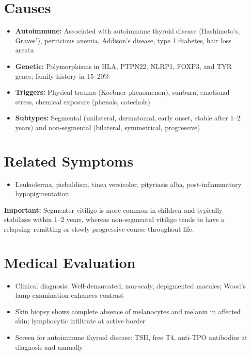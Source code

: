 \section*{Causes}
\begin{itemize}
  \item \textbf{Autoimmune:} Associated with autoimmune thyroid disease (Hashimoto's, Graves'), pernicious anemia, Addison's disease, type 1 diabetes, hair loss areata
  \item \textbf{Genetic:} Polymorphisms in HLA, PTPN22, NLRP1, FOXP3, and TYR genes; family history in 15--20\%
  \item \textbf{Triggers:} Physical trauma (Koebner phenomenon), sunburn, emotional stress, chemical exposure (phenols, catechols)
  \item \textbf{Subtypes:} Segmental (unilateral, dermatomal, early onset, stable after 1--2 years) and non-segmental (bilateral, symmetrical, progressive)
\end{itemize}

\section*{Related Symptoms}
\begin{itemize}
  \item Leukoderma, piebaldism, tinea versicolor, pityriasis alba, post-inflammatory hypopigmentation
\end{itemize}
\textbf{Important:} Segmenter vitiligo is more common in children and typically stabilizes within 1--2 years, whereas non-segmental vitiligo tends to have a relapsing--remitting or slowly progressive course throughout life.

\section*{Medical Evaluation}
\begin{itemize}
  \item Clinical diagnosis: Well-demarcated, non-scaly, depigmented macules; Wood's lamp examination enhances contrast
  \item Skin biopsy shows complete absence of melanocytes and melanin in affected skin; lymphocytic infiltrate at active border
  \item Screen for autoimmune thyroid disease: TSH, free T4, anti-TPO antibodies at diagnosis and annually
\end{itemize}

